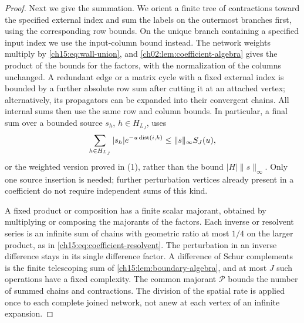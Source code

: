 \begin{proof}
Next we give the summation. We orient a finite tree of contractions toward the specified external index and sum the labels on the outermost branches first, using the corresponding row bounds. On the unique branch containing a specified input index we use the input-column bound instead. The network weights multiply by \eqref{ch15:eq:wall-union}, and \cref{ch02:lem:coefficient-algebra} gives the product of the bounds for the factors, with the normalization of the columns unchanged. A redundant edge or a matrix cycle with a fixed external index is bounded by a further absolute row sum after cutting it at an attached vertex; alternatively, its propagators can be expanded into their convergent chains. All internal sums then use the same row and column bounds. In particular, a final sum over a bounded source $s_h$, $h\in H_{L_J}$, uses
\[
 \sum_{h\in H_{L_J}} |s_h|e^{-u\operatorname{dist}(i,h)}
        \le\|s\|_\infty S_J(u),
\]
or the weighted version proved in (1), rather than the bound $|H|\|s\|_\infty$. Only one source insertion is needed; further perturbation vertices already present in a coefficient do not require independent sums of this kind.

A fixed product or composition has a finite scalar majorant, obtained by multiplying or composing the majorants of the factors. Each inverse or resolvent series is an infinite sum of chains with geometric ratio at most $1/4$ on the larger product, as in \eqref{ch15:eq:coefficient-resolvent}. The perturbation in an inverse difference stays in its single difference factor. A difference of Schur complements is the finite telescoping sum of \cref{ch15:lem:boundary-algebra}, and at most $J$ such operations have a fixed complexity. The common majorant $\mathcal P$ bounds the number of summed chains and contractions. The division of the spatial rate is applied once to each complete joined network, not anew at each vertex of an infinite expansion.


\end{proof}
